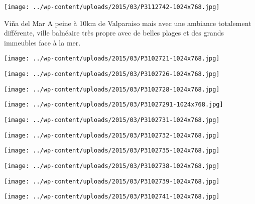 \centerline{\texttt{[image: ../wp-content/uploads/2015/03/P3112742-1024x768.jpg]} } 
 \newline
 Viña del Mar \newline
 A peine à 10km de Valparaiso mais avec une ambiance totalement différente, ville balnéaire très propre avec de belles plages et des grands immeubles face à la mer. \newline
 \newline
\centerline{\texttt{[image: ../wp-content/uploads/2015/03/P3102721-1024x768.jpg]} } 
 \newline
\centerline{\texttt{[image: ../wp-content/uploads/2015/03/P3102726-1024x768.jpg]} } 
 \newline
\centerline{\texttt{[image: ../wp-content/uploads/2015/03/P3102728-1024x768.jpg]} } 
 \newline
\centerline{\texttt{[image: ../wp-content/uploads/2015/03/P31027291-1024x768.jpg]} } 
 \newline
\centerline{\texttt{[image: ../wp-content/uploads/2015/03/P3102731-1024x768.jpg]} } 
 \newline
\centerline{\texttt{[image: ../wp-content/uploads/2015/03/P3102732-1024x768.jpg]} } 
 \newline
\centerline{\texttt{[image: ../wp-content/uploads/2015/03/P3102735-1024x768.jpg]} } 
 \newline
\centerline{\texttt{[image: ../wp-content/uploads/2015/03/P3102738-1024x768.jpg]} } 
 \newline
\centerline{\texttt{[image: ../wp-content/uploads/2015/03/P3102739-1024x768.jpg]} } 
 \newline
\centerline{\texttt{[image: ../wp-content/uploads/2015/03/P3102741-1024x768.jpg]} } 
 \newline

\newpage
 
